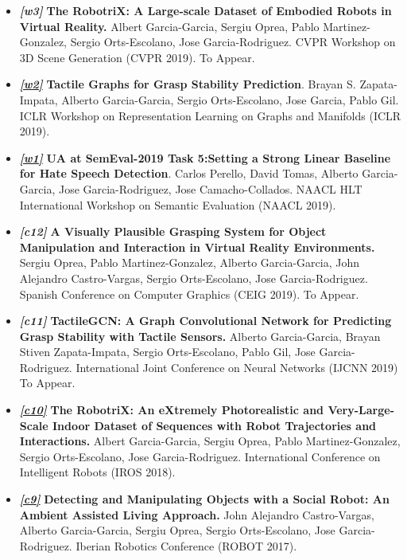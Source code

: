 \documentclass[8pt]{article}
\begin{document}
\begin{itemize}
    \item \emph{\textbf{[w3]}} \textbf{The RobotriX: A Large-scale Dataset of Embodied Robots in Virtual Reality.} Albert Garcia-Garcia, Sergiu Oprea, Pablo Martinez-Gonzalez, Sergio Orts-Escolano, Jose Garcia-Rodriguez. CVPR Workshop on 3D Scene Generation (CVPR 2019). To Appear.
    \item \emph{\textbf{\href{https://rlgm.github.io/papers/7.pdf}{[w2]}}} \textbf{Tactile Graphs for Grasp Stability Prediction}. Brayan S. Zapata-Impata, Alberto Garcia-Garcia, Sergio Orts-Escolano, Jose Garcia, Pablo Gil. ICLR Workshop on Representation Learning on Graphs and Manifolds (ICLR 2019).
    \item \emph{\textbf{\href{http://alt.qcri.org/semeval2019/data/uploads/semeval2019-proceedings.pdf}{[w1]}}} \textbf{UA at SemEval-2019 Task 5:Setting a Strong Linear Baseline for Hate Speech Detection}. Carlos Perello, David Tomas, Alberto Garcia-Garcia, Jose Garcia-Rodriguez, Jose Camacho-Collados. NAACL HLT International Workshop on Semantic Evaluation (NAACL 2019).
    \item \emph{\textbf{[c12]}} \textbf{A Visually Plausible Grasping System for Object Manipulation and Interaction in Virtual Reality Environments.} Sergiu Oprea, Pablo Martinez-Gonzalez, Alberto Garcia-Garcia, John Alejandro Castro-Vargas, Sergio Orts-Escolano, Jose Garcia-Rodriguez. Spanish Conference on Computer Graphics (CEIG 2019). To Appear.
    \item \emph{\textbf{[c11]}} \textbf{TactileGCN: A Graph Convolutional Network for Predicting Grasp Stability with Tactile Sensors.} Alberto Garcia-Garcia, Brayan Stiven Zapata-Impata, Sergio Orts-Escolano, Pablo Gil, Jose Garcia-Rodriguez. International Joint Conference on Neural Networks (IJCNN 2019) To Appear.
    \item \emph{\textbf{\href{https://ieeexplore.ieee.org/document/8594495}{[c10]}}} \textbf{The RobotriX: An eXtremely Photorealistic and Very-Large-Scale Indoor Dataset of Sequences with Robot Trajectories and Interactions.} Albert Garcia-Garcia, Sergiu Oprea, Pablo Martinez-Gonzalez, Sergio Orts-Escolano, Jose Garcia-Rodriguez. International Conference on Intelligent Robots (IROS 2018).
    \item \emph{\textbf{\href{https://link.springer.com/chapter/10.1007/978-3-319-70833-1_50}{[c9]}}} \textbf{Detecting and Manipulating Objects with a Social Robot: An Ambient Assisted Living Approach.} John Alejandro Castro-Vargas, Alberto Garcia-Garcia, Sergiu Oprea, Sergio Orts-Escolano, Jose Garcia-Rodriguez. Iberian Robotics Conference (ROBOT 2017).

\end{itemize}
\end{document}
